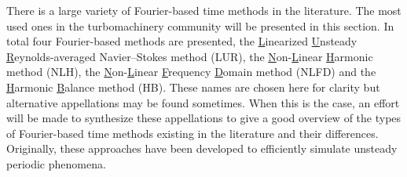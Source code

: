 

There is a large variety of Fourier-based time methods in the
literature. 
The most used ones in the turbomachinery community will be presented in this section.
In total four Fourier-based methods are presented, 
the \underline{L}inearized \underline{U}nsteady 
\underline{R}eynolds-averaged
Navier--Stokes method (LUR), 
the \underline{N}on-\underline{L}inear 
\underline{H}armonic method (NLH), the \underline{N}on-\underline{L}inear 
\underline{F}requency \underline{D}omain
method (NLFD) and the \underline{H}armonic \underline{B}alance 
method (HB).
These names are chosen here
for clarity but alternative appellations may be found sometimes. 
When this is the case, an effort will be made to synthesize
these appellations to give a good 
overview of the types of Fourier-based time methods existing in the literature
and their differences. Originally, these approaches have been developed
to efficiently simulate unsteady periodic phenomena.

